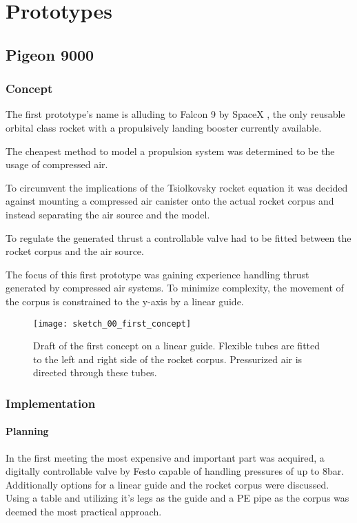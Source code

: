 \chapter{Prototypes}

\section{Pigeon 9000}

\subsection{Concept}
The first prototype's name is alluding to Falcon 9 \cite{falcon9} by SpaceX \cite{spacex}, the only reusable orbital class rocket with a propulsively landing booster currently available. 

The cheapest method to model a propulsion system was determined to be the usage of compressed air. 

To circumvent the implications of the Tsiolkovsky rocket equation \cite{rocket-equation} it was decided against mounting a compressed air canister onto the actual rocket corpus and instead separating the air source and the model.
 

To regulate the generated thrust a controllable valve had to be fitted between the rocket corpus and the air source. 

The focus of this first prototype was gaining experience handling thrust generated by compressed air systems. To minimize complexity, the movement of the corpus is constrained to the y-axis by a linear guide.

\begin{figure}[h]
\centering

\texttt{[image: sketch\_00\_first\_concept]}

\caption{Draft of the first concept on a linear guide. Flexible tubes are fitted to the left and right side of the rocket corpus. Pressurized air is directed through these tubes.}
\end{figure}

   
\subsection{Implementation}
\subsubsection{Planning}
In the first meeting the most expensive and important part was acquired, a digitally controllable valve by Festo \cite{festo-valve} capable of handling pressures of up to 8bar. Additionally options for a linear guide and the rocket corpus were discussed. Using a table and utilizing it's legs as the guide and a PE pipe as the corpus was deemed the most practical approach. 

